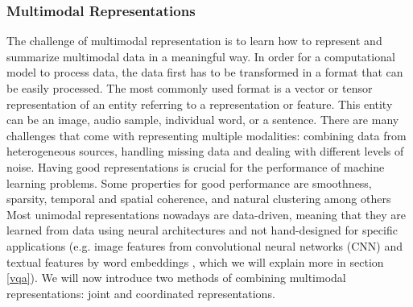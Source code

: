 \documentclass{article}
\begin{document}
\subsubsection{Multimodal Representations}

The challenge of multimodal representation is to learn how to represent and summarize multimodal data in a meaningful way. In order for a computational model to process data, the data first has to be transformed in a format that can be easily processed. The most commonly used format is a vector or tensor representation of an entity referring to a representation or feature. This entity can be an image, audio sample, individual word, or a sentence. There are many challenges that come with representing multiple modalities: combining data from heterogeneous sources, handling missing data and dealing with different levels of noise. Having good representations is crucial for the performance of machine learning problems. Some properties for good performance are smoothness, sparsity, temporal and spatial coherence, and natural clustering among others \citep{bengio2013represent} Most unimodal representations nowadays are data-driven, meaning that they are learned from data using neural architectures and not hand-designed for specific applications (e.g. image features from convolutional neural networks (CNN) \citep{krizhevsky2012imagenet} and textual features by word embeddings \citep{mikolov2013distri}, which we will explain more in section \ref{vqa}). We will now introduce two methods of combining multimodal representations: joint and coordinated representations.
\end{document}
